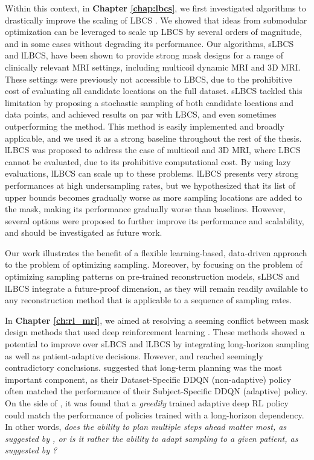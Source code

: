 Within this context, in \textbf{Chapter \ref{chap:lbcs}}, we first investigated algorithms to drastically improve the scaling of LBCS \citep{gozcu2018learning}.  We showed that ideas from submodular optimization \citep{krause2014submodular} can be leveraged to scale up LBCS by several orders of magnitude, and in some cases without degrading its performance. Our algorithms, sLBCS and lLBCS, have been shown to provide strong mask designs for a range of clinically relevant MRI settings, including multicoil dynamic MRI and 3D MRI. These settings were previously not accessible to LBCS, due to the prohibitive cost of evaluating all candidate locations on the full dataset. sLBCS tackled this limitation by proposing a stochastic sampling of both candidate locations and data points, and achieved results on par with LBCS, and even sometimes outperforming the method. This method is easily implemented and broadly applicable, and we used it as a strong baseline throughout the rest of the thesis. lLBCS was proposed to address the case of multicoil and 3D MRI, where LBCS cannot be evaluated, due to its prohibitive computational cost. By using lazy evaluations, lLBCS can scale up to these problems. lLBCS presents very strong performances at high undersampling rates, but we hypothesized that its list of upper bounds becomes gradually worse as more sampling locations are added to the mask, making its performance gradually worse than baselines. However, several options were proposed to further improve its performance and scalability, and should be investigated as future work.

Our work illustrates the benefit of a flexible learning-based, data-driven approach to the problem of optimizing sampling. Moreover, by focusing on the problem of optimizing sampling patterns on pre-trained reconstruction models, sLBCS and lLBCS integrate a future-proof dimension, as they will remain readily available to any reconstruction method that is applicable to a sequence of sampling rates.

In \textbf{Chapter \ref{ch:rl_mri}}, we aimed at resolving a seeming conflict between mask design methods that used deep reinforcement learning \citep{pineda2020active,bakker2020experimental}. These methods showed a potential to improve over sLBCS and lLBCS by integrating long-horizon sampling as well as patient-adaptive decisions. However, \citet{pineda2020active} and \citet{bakker2020experimental} reached seemingly contradictory conclusions. \citet{pineda2020active} suggested that long-term planning was the most important component, as their Dataset-Specific DDQN (non-adaptive) policy often matched the performance of their Subject-Specific DDQN (adaptive) policy. On the side of \citet{bakker2020experimental}, it was found that a \textit{greedily} trained adaptive deep RL policy could match the performance of policies trained with a long-horizon dependency. In other words, \textit{does the ability to plan multiple steps ahead matter most, as suggested by \citet{pineda2020active}, or is it rather the ability to adapt sampling to a given patient, as suggested by \citet{bakker2020experimental}?} 

